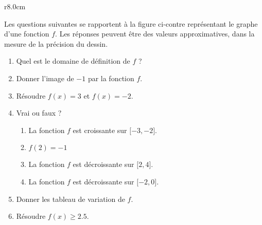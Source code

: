
\begin{exercice}\label{exosmath-0449}

    \begin{wrapfigure}{r}{8.0cm}
        \vspace{-1.5cm}
        \centering
        
    \end{wrapfigure}

    Les questions suivantes se rapportent à la figure ci-contre représentant le graphe d'une fonction \( f\). Les réponses peuvent être des valeurs approximatives, dans la mesure de la précision du dessin.
    \begin{enumerate}
        \item
            Quel est le domaine de définition de \( f\) ?
        \item
            Donner l'image de \( -1\) par la fonction \( f\).
        \item
            Résoudre \( f(x)=3\) et \( f(x)=-2\).
        \item
            Vrai ou faux ?
            \begin{enumerate}
                \item
                    La fonction \( f\) est croissante sur \( \mathopen[ -3 , -2 \mathclose]\).
                \item
                    \( f(2)=-1\)
                \item
                    La fonction \( f\) est décroissante sur \( \mathopen[ 2 , 4 \mathclose]\).
                \item
                    La fonction \( f\) est décroissante sur \( \mathopen[ -2 , 0 \mathclose]\).
            \end{enumerate}
        \item
            Donner les tableau de variation de \( f\).
        \item
            Résoudre \( f(x)\geq 2.5\).
    \end{enumerate}

\end{exercice}
